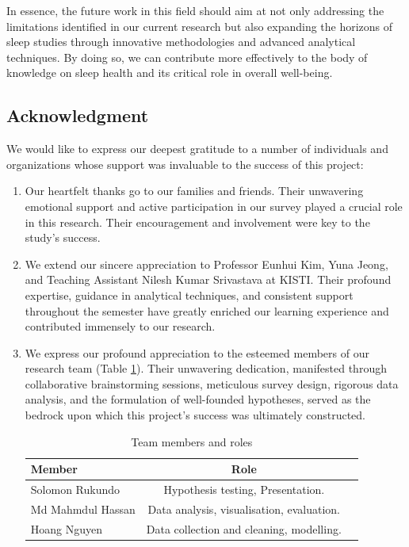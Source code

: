 \documentclass[conference]{IEEEtran}
\begin{document}
In essence, the future work in this field should aim at not only addressing the limitations identified in our current research but also expanding the horizons of sleep studies through innovative methodologies and advanced analytical techniques. By doing so, we can contribute more effectively to the body of knowledge on sleep health and its critical role in overall well-being.


\subsection*{Acknowledgment}

We would like to express our deepest gratitude to a number of individuals and organizations whose support was invaluable to the success of this project:

\begin{enumerate}
    \item Our heartfelt thanks go to our families and friends. Their unwavering emotional support and active participation in our survey played a crucial role in this research. Their encouragement and involvement were key to the study's success.

    \item We extend our sincere appreciation to Professor Eunhui Kim, Yuna Jeong, and Teaching Assistant Nilesh Kumar Srivastava at KISTI. Their profound expertise, guidance in analytical techniques, and consistent support throughout the semester have greatly enriched our learning experience and contributed immensely to our research.

    \item  We express our profound appreciation to the esteemed members of our research team (Table \ref{tab:teamroles}). Their unwavering dedication, manifested through collaborative brainstorming sessions, meticulous survey design, rigorous data analysis, and the formulation of well-founded hypotheses, served as the bedrock upon which this project's success was ultimately constructed.
    \begin{table}[ht]
        \centering
        \caption{Team members and roles}
        \label{tab:teamroles}
        \begin{tabular}{|l|c|c|}
            \hline
            \textbf{Member} & \textbf{Role} \\ \hline
            Solomon Rukundo & Hypothesis testing, Presentation. \\ \hline
            Md Mahmdul Hassan  & Data analysis, visualisation, evaluation. \\ \hline
            Hoang Nguyen  & Data collection and cleaning, modelling. \\
            \hline
        \end{tabular}
    \end{table}


\end{enumerate}
\end{document}
